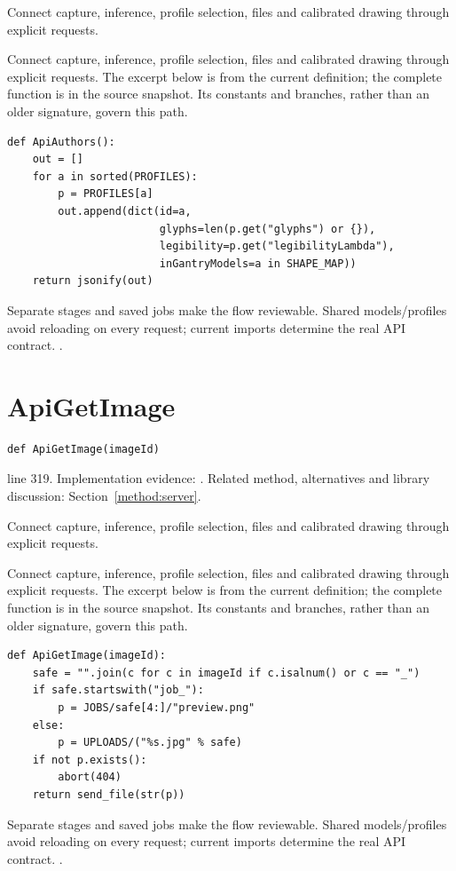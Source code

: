 Connect capture, inference, profile selection, files and calibrated drawing through explicit requests.


Connect capture, inference, profile selection, files and calibrated drawing through explicit requests. The excerpt below is from the current definition; the complete function is in the source snapshot. Its constants and branches, rather than an older signature, govern this path.


\begin{lstlisting}[style=plain]
def ApiAuthors():
    out = []
    for a in sorted(PROFILES):
        p = PROFILES[a]
        out.append(dict(id=a,
                        glyphs=len(p.get("glyphs") or {}),
                        legibility=p.get("legibilityLambda"),
                        inGantryModels=a in SHAPE_MAP))
    return jsonify(out)
\end{lstlisting}
Separate stages and saved jobs make the flow reviewable. Shared models/profiles avoid reloading on every request; current imports determine the real API contract. \cite{flaskdocs,pillowops,code2026}.


\section{ApiGetImage}\label{fn:web-server:ApiGetImage}
\begin{lstlisting}[style=sig]
def ApiGetImage(imageId)
\end{lstlisting}
 line 319. Implementation evidence: \cite{code2026}. Related method, alternatives and library discussion: Section~\ref{method:server}.


Connect capture, inference, profile selection, files and calibrated drawing through explicit requests.


Connect capture, inference, profile selection, files and calibrated drawing through explicit requests. The excerpt below is from the current definition; the complete function is in the source snapshot. Its constants and branches, rather than an older signature, govern this path.


\begin{lstlisting}[style=plain]
def ApiGetImage(imageId):
    safe = "".join(c for c in imageId if c.isalnum() or c == "_")
    if safe.startswith("job_"):
        p = JOBS/safe[4:]/"preview.png"
    else:
        p = UPLOADS/("%s.jpg" % safe)
    if not p.exists():
        abort(404)
    return send_file(str(p))
\end{lstlisting}
Separate stages and saved jobs make the flow reviewable. Shared models/profiles avoid reloading on every request; current imports determine the real API contract. \cite{flaskdocs,pillowops,code2026}.


